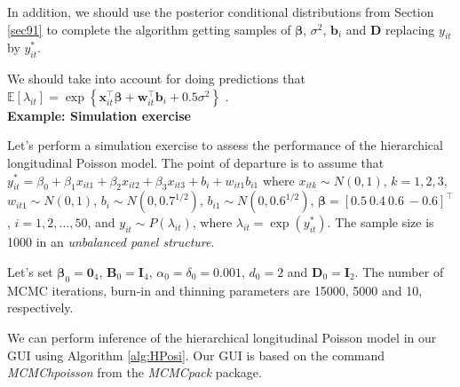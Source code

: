 In addition, we should use the posterior conditional distributions from Section \ref{sec91} to complete the algorithm getting samples of $\bm{\beta}$, $\sigma^2$, $\bm{b}_i$ and $\bm{D}$ replacing $y_{it}$ by ${y}_{it}^*$.

We should take into account for doing predictions that $\mathbb{E}[{\lambda}_{it}]=\exp\left\{\bm{x}_{it}^{\top}\bm{\beta}+\bm{w}_{it}^{\top}\bm{b}_i+0.5\sigma^2\right\}$ \cite[~pag. 137]{diggle2002analysis}.\\

\textbf{Example: Simulation exercise}

Let's perform a simulation exercise to assess the performance of the hierarchical longitudinal Poisson model. The point of departure is to assume that $y_{it}^*=\beta_0+\beta_1x_{it1}+\beta_2x_{it2}+\beta_3x_{it3}+b_i+w_{it1}b_{i1}$ where $x_{itk}\sim N(0,1)$, $k=1,2,3$, $w_{it1}\sim N(0,1)$, $b_i\sim N(0, 0.7^{1/2})$, $b_{i1}\sim N(0, 0.6^{1/2})$, $\bm{\beta}=[0.5 \ 0.4 \ 0.6 \ -0.6]^{\top}$, $i=1,2,\dots,50$, and $y_{it}\sim P(\lambda_{it})$, where $\lambda_{it}=\exp(y_{it}^*)$. The sample size is 1000 in an \textit{unbalanced panel structure}.

Let's set $\bm{\beta}_0=\bm{0}_4$, $\bm{B}_0=\bm{I}_4$, $\alpha_0=\delta_0=0.001$, $d_0=2$ and $\bm{D}_0=\bm{I}_2$. The number of MCMC iterations, burn-in and thinning parameters are 15000, 5000 and 10, respectively.

We can perform inference of the hierarchical longitudinal Poisson model in our GUI using Algorithm \ref{alg:HPosi}. Our GUI is based on the command \textit{MCMChpoisson} from the \textit{MCMCpack} package. 

